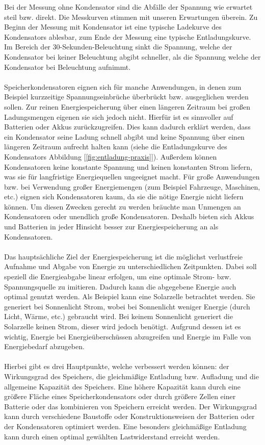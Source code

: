 Bei der Messung ohne Kondensator sind die Abfälle der Spannung wie erwartet steil bzw. direkt. 
Die Messkurven stimmen mit unseren Erwartungen überein. Zu Beginn der Messung mit Kondensator ist eine typische Ladekurve des Kondensators ablesbar, zum Ende der Messung eine typische Entladungskurve. Im Bereich der 30-Sekunden-Beleuchtung sinkt die Spannung, welche der Kondensator bei keiner Beleuchtung abgibt schneller, als die Spannung welche der Kondensator bei Beleuchtung aufnimmt.
\\
\\
Speicherkondensatoren eignen sich für manche Anwendungen, in denen zum Beispiel kurzzeitige Spannungseinbrüche überbrückt bzw. ausgeglichen werden sollen.
Zur reinen Energiespeicherung über einen längeren Zeitraum bei großen Ladungsmengen eigenen sie sich jedoch nicht. Hierfür ist es sinnvoller auf Batterien oder Akkus zurückzugreifen. Dies kann dadurch erklärt werden, dass ein Kondensator seine Ladung schnell abgibt und keine Spannung über einen längeren Zeitraum aufrecht halten kann (siehe die Entladungskurve des Kondensators Abbildung [\ref{fig:entladung-praxis}]). 
Außerdem können Kondensatoren keine konstante Spannung und keinen konstanten Strom liefern, was sie für langfristige Energiequellen ungeeignet macht.
Für große Anwendungen bzw. bei Verwendung großer Energiemengen (zum Beispiel Fahrzeuge, Maschinen, etc.) eignen sich Kondensatoren kaum, da sie die nötige Energie nicht liefern können. Um diesen Zwecken gerecht zu werden bräuchte man Unmengen an Kondensatoren oder unendlich große Kondensatoren. Deshalb bieten sich Akkus und Batterien in jeder Hinsicht besser zur Energiespeicherung an als Kondensatoren.
\\
\\
Das hauptsächliche Ziel der Energiespeicherung ist die möglichst verlustfreie Aufnahme und Abgabe von Energie zu unterschiedlichen Zeitpunkten. Dabei soll speziell die Energieabgabe linear erfolgen, um eine optimale Strom- bzw. Spannungsquelle zu imitieren. Dadurch kann die abgegebene Energie auch optimal genutzt werden.
Als Beispiel kann eine Solarzelle betrachtet werden. Sie generiert bei Sonnenlicht Strom, wobei bei Sonnenlicht weniger Energie (durch Licht, Wärme, etc.) gebraucht wird. Bei keinem Sonnenlicht generiert die Solarzelle keinen Strom, dieser wird jedoch benötigt. Aufgrund dessen ist es wichtig, Energie bei Energieüberschüssen abzugreifen und Energie im Falle von Energiebedarf abzugeben.
\\
\\
Hierbei gibt es drei Hauptpunkte, welche verbessert werden können: der Wirkungsgrad des Speichers, die gleichmäßige Entladung bzw. Aufladung und die allgemeine Kapazität des Speichers.
Eine höhere Kapazität kann durch eine größere Fläche eines Speicherkondensators oder durch größere Zellen einer Batterie oder das kombinieren von Speichern erreicht werden.
Der Wirkungsgrad kann durch verschiedene Baustoffe oder Konstruktionsweisen der Batterien oder der Kondensatoren optimiert werden.
Eine besonders gleichmäßige Entladung kann durch einen optimal gewählten Lastwiderstand erreicht werden.